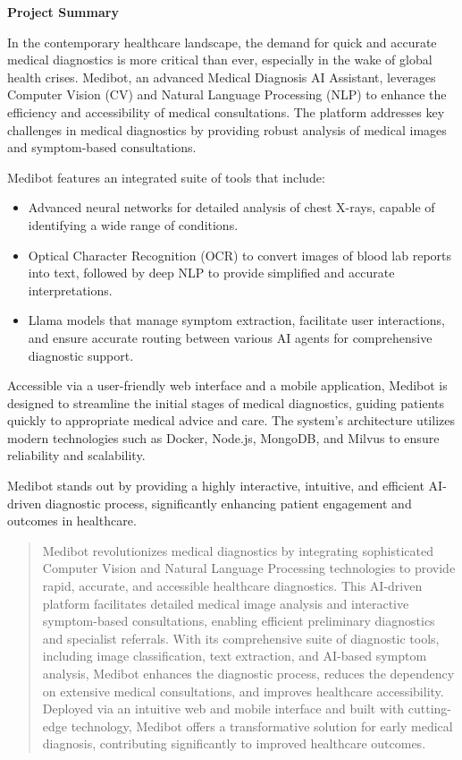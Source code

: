 \centerline{\textbf{Project Summary}}
In the contemporary healthcare landscape, the demand for quick and accurate medical diagnostics is more critical than ever, especially in the wake of global health crises. Medibot, an advanced Medical Diagnosis AI Assistant, leverages Computer Vision (CV) and Natural Language Processing (NLP) to enhance the efficiency and accessibility of medical consultations. The platform addresses key challenges in medical diagnostics by providing robust analysis of medical images and symptom-based consultations.

Medibot features an integrated suite of tools that include:
\begin{itemize}
    \item Advanced neural networks for detailed analysis of chest X-rays, capable of identifying a wide range of conditions.
    \item Optical Character Recognition (OCR) to convert images of blood lab reports into text, followed by deep NLP to provide simplified and accurate interpretations.
    \item Llama models that manage symptom extraction, facilitate user interactions, and ensure accurate routing between various AI agents for comprehensive diagnostic support.
\end{itemize}

Accessible via a user-friendly web interface and a mobile application, Medibot is designed to streamline the initial stages of medical diagnostics, guiding patients quickly to appropriate medical advice and care. The system's architecture utilizes modern technologies such as Docker, Node.js, MongoDB, and Milvus to ensure reliability and scalability.

Medibot stands out by providing a highly interactive, intuitive, and efficient AI-driven diagnostic process, significantly enhancing patient engagement and outcomes in healthcare.

\begin{abstract}
Medibot revolutionizes medical diagnostics by integrating sophisticated Computer Vision and Natural Language Processing technologies to provide rapid, accurate, and accessible healthcare diagnostics. This AI-driven platform facilitates detailed medical image analysis and interactive symptom-based consultations, enabling efficient preliminary diagnostics and specialist referrals. With its comprehensive suite of diagnostic tools, including image classification, text extraction, and AI-based symptom analysis, Medibot enhances the diagnostic process, reduces the dependency on extensive medical consultations, and improves healthcare accessibility. Deployed via an intuitive web and mobile interface and built with cutting-edge technology, Medibot offers a transformative solution for early medical diagnosis, contributing significantly to improved healthcare outcomes.
\end{abstract}
